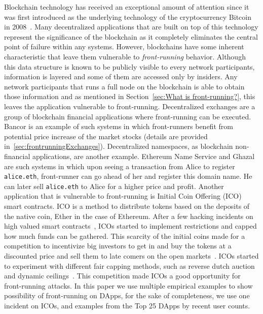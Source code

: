 Blockchain technology has received an exceptional amount of attention since it was first introduced as the underlying technology of the cryptocurrency Bitcoin in 2008~\cite{nakamoto2008bitcoin}. Many decentralized applications that are built on top of this technology represent the significance of the blockchain as it completely eliminates the central point of failure within any systems. However, blockchains have some inherent characteristic that leave them vulnerable to \emph{front-running} behavior. Although this data structure is known to be publicly visible to every network participants, information is layered  and some of them are accessed only by insiders. Any network participants that runs a full node on the blockchain is able to obtain those information and as mentioned in Section~\ref{sec:What is front-running?}, this leaves the application vulnerable to front-running. Decentralized exchanges are a group of blockchain financial applications where front-running can be executed. 
Bancor \cite{hertzog2017bancor} is an example of such systems in which front-runners benefit from potential price increase of the market stocks (details are provided in~\ref{sec:frontrunningExchanges}). Decentralized namespaces, as blockchain non-financial applications, are another example. Ethereum Name Service and Ghazal \cite{moosavighazal} are such systems in which upon seeing a transaction from Alice to register \texttt{alice.eth}, front-runner can go ahead of her and register this domain name. He can later sell \texttt{alice.eth} to Alice for a higher price and profit.
Another application that is vulnerable to front-running is Initial Coin Offering (ICO) smart contracts. ICO is a method to distribute tokens based on the deposits of the native coin, Ether in the case of Ethereum. After a few hacking incidents on high valued smart contracts~\cite{siegel2016daohack}, ICOs started to implement restrictions and capped how much funds can be gathered. This scarcity of the initial coins made for a competition to incentivize big investors to get in and buy the tokens at a discounted price and sell them to late comers on the open markets~\cite{zetzsche2018ico, li2018initial}. ICOs started to experiment with different fair capping methods, such as reverse dutch auction and dynamic ceilings~\cite{kaal2017initial}.  This competition made ICOs a good opportunity for front-running attacks.  In this paper we use multiple empirical examples to show possibility of front-running on DApps, for the sake of completeness, we use one incident on ICOs, and examples from the Top 25 DApps by recent user counts. %



